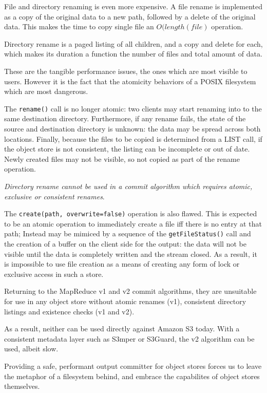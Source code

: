 \documentclass[conference]{IEEEtran}
\begin{document}
File and directory renaming is even more expensive.
A file rename is implemented as a copy of the original data to a new path,
followed by a delete of the original data.
This makes the time to copy single file an $O(length(file)$ operation.

Directory rename is a paged listing of all children, and a copy and delete for
each, which makes its duration a function the number of files and total amount of data.

These are the tangible performance issues, the ones which are most visible
to users.
However it is the fact that the atomicity behaviors of a POSIX filesystem
which are most dangerous.

The \texttt{rename()} call is no longer atomic: two clients may start renaming
into to the same destination directory.
Furthermore, if any rename fails, the state of the source and destination
directory is unknown: the data may be spread across both locations.
Finally, because the files to be copied is determined from a LIST call,
if the object store is not consistent, the listing can be incomplete or out of
date.
Newly created files may not be visible, so not copied as part of the rename
operation.

\emph{Directory rename cannot be used in a commit algorithm which
requires atomic, exclusive or consistent renames}.

The \texttt{create(path, overwrite=false)} operation is also flawed.
This is expected to be an atomic operation to immediately create a file iff there is
no entry at that path;
Instead may be mimiced by a sequence of the \texttt{getFileStatus()} call
and the creation of a buffer on the client side for the output: the data
will not be visible until the data is completely written and the stream
closed.
As a result, it is impossible to use file creation as a means of creating any
form of lock or exclusive access in such a store.


Returning to the MapReduce v1 and v2 commit algorithms, they are unsuitable for
use in any object store without atomic renames (v1), consistent
directory listings and existence checks (v1 and v2).

As a result, neither can be used directly against Amazon S3 today.
With a consistent metadata layer such as S3mper or S3Guard, the v2 algorithm
can be used, albeit slow.

Providing a safe, performant output committer for object stores forces
us to leave the metaphor of a filesystem behind, and embrace
the capabilites of object stores themselves.
\end{document}
